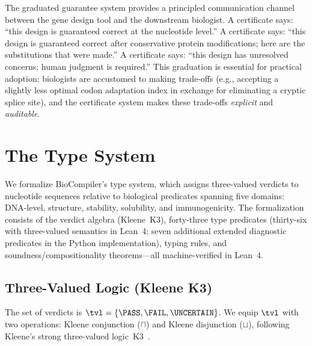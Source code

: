 The graduated guarantee system provides a principled communication
channel between the gene design tool and the downstream
biologist.
A \GOLD{} certificate says: ``this design is guaranteed correct at the
nucleotide level.''
A \SILVER{} certificate says: ``this design is guaranteed correct
after conservative protein modifications; here are the substitutions
that were made.''
A \BRONZE{} certificate says: ``this design has unresolved concerns;
human judgment is required.''
This graduation is essential for practical adoption: biologists are
accustomed to making trade-offs (e.g., accepting a slightly less
optimal codon adaptation index in exchange for eliminating a cryptic
splice site), and the certificate system makes these trade-offs
\emph{explicit} and \emph{auditable}.

\section{The Type System}\label{sec:typesys}

We formalize BioCompiler's type system, which assigns three-valued
verdicts to nucleotide sequences relative to biological predicates
spanning five domains: DNA-level, structure, stability, solubility,
and immunogenicity.
The formalization consists of the verdict algebra (Kleene~K3),
forty-three type predicates (thirty-six with three-valued semantics in Lean~4; seven additional extended diagnostic predicates in the Python implementation), typing
rules, and soundness/compositionality theorems---all machine-verified
in Lean~4.

\subsection{Three-Valued Logic (Kleene K3)}\label{sec:3vl}

The set of verdicts is $\tvl = \{\PASS, \FAIL, \UNCERTAIN\}$.
We equip $\tvl$ with two operations: Kleene conjunction ($\sqcap$) and
Kleene disjunction ($\sqcup$), following Kleene's strong three-valued
logic~K3~\cite{kleene1952introduction}.

